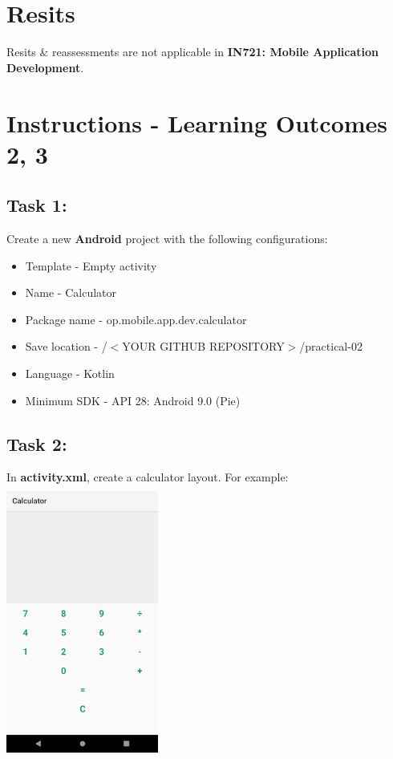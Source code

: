 \documentclass{article}
\begin{document}
\section*{Resits}
Resits \& reassessments are not applicable in \textbf{IN721: Mobile Application Development}.

\section*{Instructions - Learning Outcomes 2, 3}

\subsection*{Task 1:} Create a new \textbf{Android} project with the following configurations:
\begin{itemize}
	\item Template - Empty activity
	\item Name - Calculator
	\item Package name - op.mobile.app.dev.calculator
	\item Save location - /$<$YOUR GITHUB REPOSITORY$>$/practical-02
	\item Language - Kotlin
	\item Minimum SDK - API 28: Android 9.0 (Pie) 
\end{itemize}

\subsection*{Task 2:} In \textbf{activity.xml}, create a calculator layout. For example: \\

\includegraphics[width=5cm, height=9cm]{../tex/img/02-android-overview/practical/calculator.png}  \\
\end{document}
